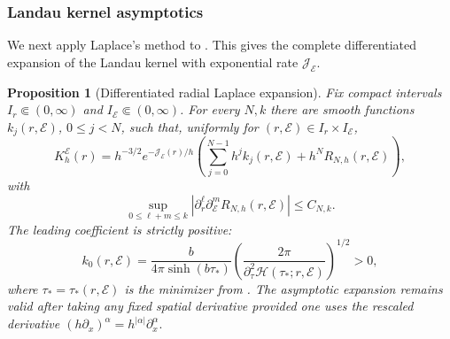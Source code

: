 \documentclass[11pt]{article}
\newtheorem{proposition}[theorem]{Proposition}
\newcommand{\cE}{\mathcal E}
\newcommand{\cJ}{\mathcal J}
\newcommand{\abs}[1]{\left|#1\right|}
\begin{document}
\subsubsection{Landau kernel asymptotics}
We next apply Laplace's method to .  This gives the complete differentiated expansion of the Landau kernel with exponential rate $\cJ_\cE$.
\begin{proposition}[Differentiated radial Laplace expansion]\label{prop:K-Laplace}
Fix compact intervals $I_r\Subset(0,\infty)$ and $I_\cE\Subset(0,\infty)$.  For every $N,k$ there are smooth functions $k_j(r,\cE)$, $0\le j<N$, such that, uniformly for $(r,\cE)\in I_r\times I_\cE$,
\begin{equation}\label{eq:K-expansion}
 K_h^\cE(r)
 =h^{-3/2}e^{-\cJ_\cE(r)/h}
 \left(\sum_{j=0}^{N-1}h^jk_j(r,\cE)+h^NR_{N,h}(r,\cE)\right),
\end{equation}
with
\begin{equation}\label{eq:K-remainder}
 \sup_{0\le \ell+m\le k}
 \abs{\partial_r^\ell\partial_\cE^mR_{N,h}(r,\cE)}\le C_{N,k}.
\end{equation}
The leading coefficient is strictly positive:
\begin{equation}\label{eq:k0}
 k_0(r,\cE)
 =\frac{b}{4\pi\sinh(b\tau_*)}
 \left(\frac{2\pi}{\partial_\tau^2\mathcal{H}(\tau_*;r,\cE)}\right)^{1/2}>0,
\end{equation}
where $\tau_*=\tau_*(r,\cE)$ is the minimizer from .  The asymptotic expansion remains valid after taking any fixed spatial derivative provided one uses the rescaled derivative $(h\partial_{x})^{\alpha} = h^{|\alpha|}\partial_{x}^{\alpha}.$
\end{proposition}
\end{document}
